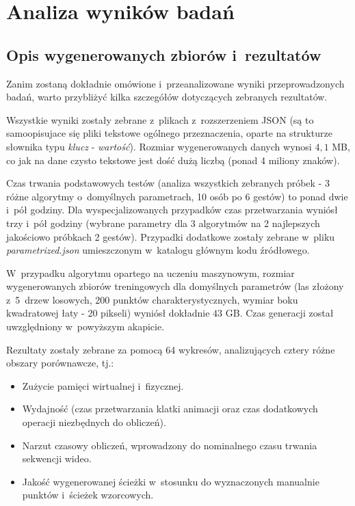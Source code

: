 \chapter{Analiza wyników badań}\label{Chapter_AnalizaRezultatow}

  \section{Opis wygenerowanych zbiorów i~rezultatów}\label{Section_Results}
    Zanim zostaną dokładnie omówione i~przeanalizowane wyniki przeprowadzonych badań, warto przybliżyć kilka szczegółów dotyczących zebranych rezultatów.

    Wszystkie wyniki zostały zebrane z~plikach z~rozszerzeniem JSON (są to samoopisujace się pliki tekstowe ogólnego przeznaczenia, oparte na strukturze słownika typu \textit{klucz} - \textit{wartość}). Rozmiar wygenerowanych danych wynosi $4,1$ MB, co jak na dane czysto tekstowe jest dość dużą liczbą (ponad 4 miliony znaków).

    Czas trwania podstawowych testów (analiza wszystkich zebranych próbek - 3 różne algorytmy o~domyślnych parametrach, 10 osób po 6 gestów) to ponad dwie i~pół godziny. Dla wyspecjalizowanych przypadków czas przetwarzania wyniósł trzy i~pół godziny (wybrane parametry dla 3 algorytmów na 2 najlepszych jakościowo próbkach 2 gestów). Przypadki dodatkowe zostały zebrane w~pliku \textit{parametrized.json} umieszczonym w~katalogu głównym kodu źródłowego.

    W~przypadku algorytmu opartego na uczeniu maszynowym, rozmiar wygenerowanych zbiorów treningowych dla domyślnych parametrów (las złożony z~5~drzew losowych, 200 punktów charakterystycznych, wymiar boku kwadratowej łaty - 20 pikseli) wyniósł dokładnie $43$ GB. Czas generacji został uwzględniony w~powyższym akapicie.

    Rezultaty zostały zebrane za pomocą 64 wykresów, analizujących cztery różne obszary porównawcze, tj.:
    \begin{itemize}
      \item Zużycie pamięci wirtualnej i~fizycznej.
      \item Wydajność (czas przetwarzania klatki animacji oraz czas dodatkowych operacji niezbędnych do obliczeń).
      \item Narzut czasowy obliczeń, wprowadzony do nominalnego czasu trwania sekwencji wideo.
      \item Jakość wygenerowanej ścieżki w~stosunku do wyznaczonych manualnie punktów i~ścieżek wzorcowych.
    \end{itemize}

